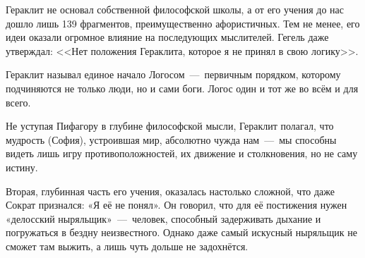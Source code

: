 
Гераклит не основал собственной философской школы, а от его учения до нас дошло лишь 139 фрагментов, преимущественно афористичных. Тем не менее, его идеи оказали огромное влияние на последующих мыслителей. Гегель даже утверждал: <<Нет положения Гераклита, которое я не принял в свою логику>>.

Гераклит называл единое начало Логосом~---~первичным порядком, которому подчиняются не только люди, но и сами боги. Логос один и тот же во всём и для всего.

Не уступая Пифагору в глубине философской мысли, Гераклит полагал, что мудрость (София), устроившая мир, абсолютно чужда нам~---~мы способны видеть лишь игру противоположностей, их движение и столкновения, но не саму истину.

Вторая, глубинная часть его учения, оказалась настолько сложной, что даже Сократ признался: «Я её не понял». Он говорил, что для её постижения нужен «делосский ныряльщик»~---~человек, способный задерживать дыхание и погружаться в бездну неизвестного. Однако даже самый искусный ныряльщик не сможет там выжить, а лишь чуть дольше не задохнётся.

